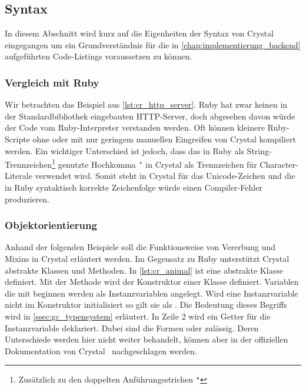\subsection{Syntax}
\label{ssec:gc_syntax}

In diesem Abschnitt wird kurz auf die Eigenheiten der Syntax von Crystal
eingegangen um ein Grundverständnis für die in
\cref{chap:implementierung_backend} aufgeführten Code-Listings voraussetzen zu
können.

\subsubsection{Vergleich mit Ruby}
\label{sssec:gcs_vergleich_zu_ruby}

Wir betrachten das Beispiel aus \cref{lst:cr_http_server}.  Ruby hat zwar keinen
in der Standardbibliothek eingebauten HTTP-Server, doch abgesehen davon würde
der Code vom Ruby-Interpreter verstanden werden.  Oft können kleinere
Ruby-Scripte ohne oder mit nur geringem manuellen Eingreifen von Crystal
kompiliert werden.  Ein wichtiger Unterschied ist jedoch, dass das in Ruby als
String-Trennzeichen\footnote{Zusätzlich zu den doppelten Anführungsstrichen
\texttt{"}} genutzte Hochkomma \texttt{'} in Crystal als Trennzeichen für
Character-Literale verwendet wird.  Somit steht  in Crystal für das
Unicode-Zeichen  und die in Ruby syntaktisch korrekte Zeichenfolge
 würde einen Compiler-Fehler produzieren.



\subsubsection{Objektorientierung}
\label{sssec:gcs_objektorientierung}

Anhand der folgenden Beispiele soll die Funktionsweise von Vererbung und
Mixins in Crystal erläutert werden.  Im Gegensatz zu Ruby unterstützt
Crystal abstrakte Klassen und Methoden.  In \cref{lst:cr_animal} ist eine
abstrakte Klasse  definiert.  Mit der Methode 
wird der Konstruktor einer Klasse definiert.  Variablen die mit 
beginnen werden als Instanzvariablen angelegt.  Wird eine Instanzvariable nicht
im Konstruktor initialisiert so gilt sie als .  Die Bedeutung
dieses Begriffs wird in \cref{ssec:gc_typensystem} erläutert.  In Zeile 2 wird
ein Getter für die Instanzvariable  deklariert.  Dabei sind die
Formen   oder  zulässig.  Deren
Unterschiede werden hier nicht weiter behandelt, können aber in der offiziellen
Dokumentation von Crystal~\cite{crystaldoc} nachgeschlagen werden.

